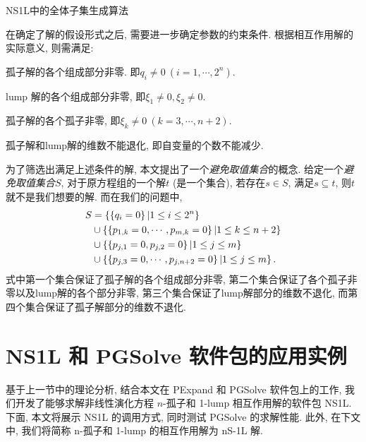 \begin{algorithm}
\caption{NS1L中的全体子集生成算法}\label{allsubset}
\end{algorithm}

在确定了解的假设形式之后, 需要进一步确定参数的约束条件. 根据相互作用解的实际意义, 则需满足:
\begin{compactenum}[(1)]
\item 孤子解的各个组成部分非零. 即$q_i\neq 0~(i=1,\cdots,2^n)$.
\item lump 解的各个组成部分非零, 即$\xi_1\neq 0,\xi_2\neq 0$.
\item 孤子解的各个孤子非零, 即$\xi_k\neq 0~(k=3,\cdots,n+2)$.
\item 孤子解和lump解的维数不能退化, 即自变量的个数不能减少. 
\end{compactenum}

为了筛选出满足上述条件的解, 本文提出了一个\emph{避免取值集合}的概念. 给定一个\emph{避免取值集合}$S$, 对于原方程组的一个解$t$ (是一个集合), 若存在$s\in S$, 满足$s\subseteq t$, 则$t$就不是我们想要的解. 而在我们的问题中, 
\begin{equation}
\begin{split}
    S&=\left\{\left\{q_i=0\right\}|1\le i \le 2^n\right\} \\ 
     &\cup \left\{\left\{p_{1,k}=0,\cdots,p_{m,k}=0\right\}|1\le k \le n+2\right\}  \\
     &\cup \left\{\left\{p_{j,1}=0,p_{j,2}=0\right\}|1\le j \le m\right\} \\ 
     &\cup \left\{\left\{p_{j,3}=0,\cdots,p_{j,n+2}=0\right\}|1\le j \le m\right\} . 
\end{split}
\end{equation}
式中第一个集合保证了孤子解的各个组成部分非零, 第二个集合保证了各个孤子非零以及lump解的各个部分非零, 第三个集合保证了lump解部分的维数不退化, 而第四个集合保证了孤子解部分的维数不退化.

\section{NS1L 和 PGSolve 软件包的应用实例}
基于上一节中的理论分析, 结合本文在 PExpand 和 PGSolve 软件包上的工作, 我们开发了能够求解非线性演化方程 $n$-孤子和 1-lump 相互作用解的软件包 NS1L. 下面, 本文将展示 NS1L 的调用方式, 同时测试 PGSolve 的求解性能. 此外, 在下文中, 我们将简称 n-孤子和 1-lump 的相互作用解为 nS-1L 解. 

